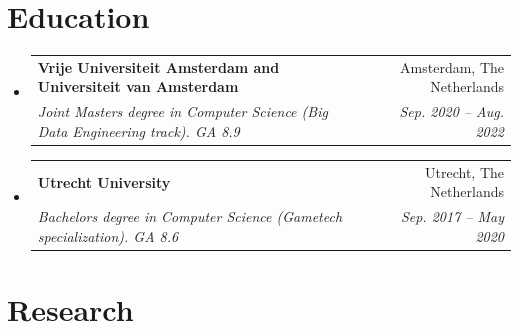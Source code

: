 \documentclass[letterpaper,11pt]{article}
\makeatletter
\newcommand{\resumeSubheading}[4]{
  \vspace{-2pt}\item
    \begin{tabular*}{0.97\textwidth}[t]{l@{\extracolsep{\fill}}r}
      \textbf{#1} & #2 \\
      \textit{\small#3} & \textit{\small #4} \\
    \end{tabular*}\vspace{-7pt}
}
\newcommand{\resumeSubHeadingListStart}{\begin{itemize}[leftmargin=0.15in, label={}]}
\newcommand{\resumeSubHeadingListEnd}{\end{itemize}}
\makeatother
\begin{document}
\section{Education}
\resumeSubHeadingListStart
    \resumeSubheading
    {Vrije Universiteit Amsterdam and Universiteit van Amsterdam}{Amsterdam, The Netherlands}
    {Joint Masters degree in Computer Science (Big Data Engineering track). GA 8.9}{Sep. 2020 -- Aug. 2022}
  \resumeSubheading
    {Utrecht University}{Utrecht, The Netherlands}
    {Bachelors degree in Computer Science (Gametech specialization). GA 8.6 }{Sep. 2017 -- May 2020}
\resumeSubHeadingListEnd


\section{Research}
\end{document}
